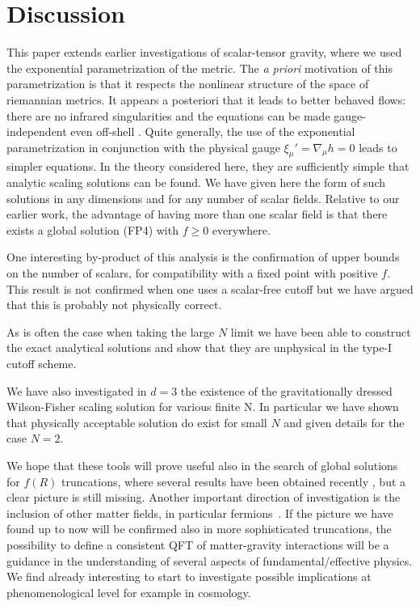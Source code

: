 \documentclass[11pt]{book} %
\begin{document}
\section{Discussion}

This paper extends earlier investigations of scalar-tensor
gravity, where we used the exponential parametrization of the metric.
The {\it a priori} motivation of this parametrization is that
it respects the nonlinear structure of the space of riemannian metrics.
It appears a posteriori that it leads to better behaved flows:
there are no infrared singularities \cite{pv1,falls}
and the equations can be made gauge-independent even off-shell
\cite{falls}.
Quite generally, the use of the exponential parametrization
in conjunction with the physical gauge $\xi_\mu'=\nabla_\mu h=0$
leads to simpler equations.
In the theory considered here, they are sufficiently simple
that analytic scaling solutions can be found.
We have given here the form of such solutions in any dimensions
and for any number of scalar fields.
Relative to our earlier work, the advantage of having more than
one scalar field is that there exists a global solution (FP4)
with $f\geq 0$ everywhere.

One interesting by-product of this analysis is the confirmation
of upper bounds on the number of scalars, for compatibility with
a fixed point with positive $f$.
This result is not confirmed when one uses a scalar-free cutoff
but we have argued that this is probably not physically correct.

As is often the case when taking the large $N$ limit we have been able to construct the exact analytical solutions
and show that they are unphysical in the type-I cutoff scheme.

We have also investigated in $d=3$ the existence of the gravitationally dressed Wilson-Fisher scaling solution for various finite N.
In particular we have shown that physically acceptable solution do exist for small $N$ and given details for the case $N=2$.

We hope that these tools will prove useful also in the search
of global solutions for $f(R)$ truncations,
where several results have been obtained recently
\cite{various}, but a clear picture is still missing.
Another important direction of investigation is the inclusion of other matter fields, in particular fermions~\cite{Yuk,EG,VZ}.
If the picture we have found up to now will be confirmed also in more sophisticated truncations,
the possibility to define a consistent QFT of matter-gravity interactions will be a guidance in the understanding of several aspects of fundamental/effective physics.
We find already interesting to start to investigate possible implications at phenomenological level for example in cosmology.
\end{document}
